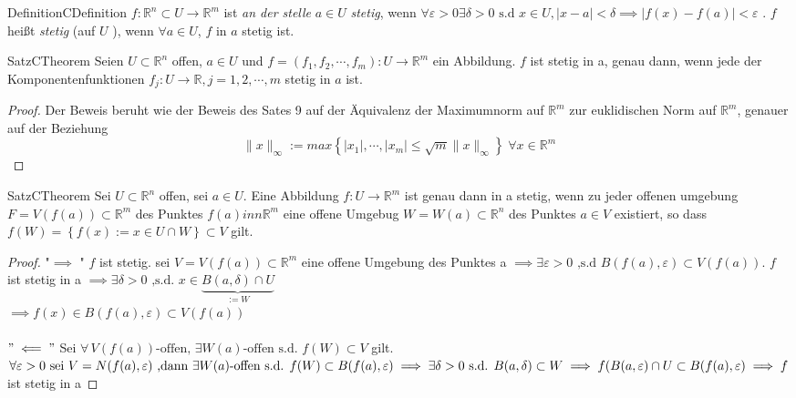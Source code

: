 \documentclass[a4paper]{memoir}
\begin{document}
\begin{ibox}[]{Definition}{CDefinition}
    $ f: \mathbb{R}^n  \subset U \to \mathbb{R}^m $ ist \textit{an der stelle} $ a \in  U $ \textit{stetig}, wenn $ \forall \varepsilon 
	>0 \exists \delta >0 \text{ s.d } x \in  U, \left| x-a \right| < \delta \implies \left| f(x)-f(a) \right| < \varepsilon $ . $ f $ heißt
	\textit{stetig} (auf $ U $ ), wenn $ \forall  a \in U $, $ f \text{ in } a $ stetig ist. 
\end{ibox}

\begin{ibox}[14]{Satz}{CTheorem}
    Seien $ U \subset \mathbb{R}^n  $ offen, $ a \in  U $ und $ f=(f_1,f_2,\cdots, f_m): U \to \mathbb{R}^m  $ ein Abbildung. $ f $ ist 
	stetig in a, genau dann, wenn jede der Komponentenfunktionen $ f_{j} :U \to \mathbb{R} , j = 1,2, \cdots, m $ stetig in $ a $ ist.
\end{ibox}

\begin{proof}
	Der Beweis beruht wie der Beweis des Sates 9 auf der Äquivalenz der Maximumnorm auf $ \mathbb{R}^m $ zur euklidischen Norm auf 
	$ \mathbb{R}^m $, genauer auf der Beziehung
	$$ \|x \|_{\infty}:= max \left\{ \left| x_1 \right| ,\cdots, \left| x_m \right| \leq \sqrt{m} \|x \|_{\infty} \right\} \;  
	\forall  x \in  \mathbb{R}^m$$
	
\end{proof}
\begin{ibox}[15]{Satz}{CTheorem}
    Sei $ U \subset  \mathbb{R}^n  $ offen, sei $ a \in  U $. Eine Abbildung $ f: U \to \mathbb{R}^m $ ist genau dann in a stetig,
	wenn zu jeder offenen umgebung $ F=V(f(a)) \subset \mathbb{R}^m $ des Punktes $ f(a)inn \mathbb{R}^m $ eine offene Umgebug
	$ W = W(a) \subset  \mathbb{R}^n  $ des Punktes $ a \in  V$ existiert, so dass $ f(W) = \left\{ f(x) := x \in U \cap W \right\} 
	\subset  V$ gilt. 
\end{ibox}

\begin{proof}
	"$  \implies$ " $ f $ ist stetig. sei $ V = V \left( f \left( a \right)  \right)  \subset  \mathbb{R}^m $ 
	eine offene Umgebung des Punktes a  $ \implies \exists 
	\varepsilon  >0 \text{ ,s.d } B(f(a), \varepsilon ) \subset  V(f(a))$. $ f $ ist stetig in a $ \implies \exists \delta > 0 
	\text{ ,s.d. } x \in  \underbrace{B(a, \delta) \cap U}_{:=W} $ \\ $\implies f(x) \in B(f(a), \varepsilon ) \subset  V(f(a))$\\ \\
	$ "\impliedby" $ Sei $ \forall \, V(f(a)) \text{-offen, } \exists W(a) \text{-offen s.d. } f(W) \subset  V $ gilt.
	$ \forall \varepsilon >0 \text{ sei } V = N(f(a), \varepsilon ) \\
	\text{ ,dann } \exists W(a) \text{-offen s.d. } f(W) \subset B(f(a), \varepsilon ) \implies 
	\exists  \delta >0 \text{ s.d. } B(a,\delta) \subset  W \\ 
	\implies  f(B(a, \varepsilon ) \cap U \subset B(f(a), \varepsilon ) \implies 
	f$ ist stetig in a   
\end{proof}
\end{document}
